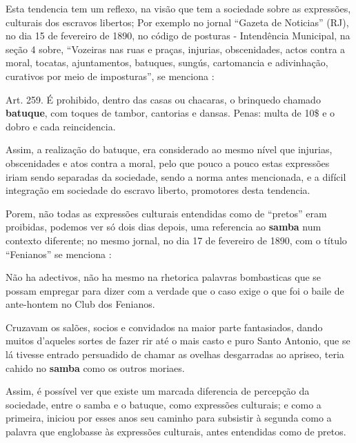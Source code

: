 Esta tendencia tem um reflexo, na visão que tem a sociedade sobre as expressões,
culturais dos escravos libertos; Por exemplo no jornal ``Gazeta de Noticias'' (RJ), 
no dia 15 de fevereiro de 1890,
no código de posturas - Intendência Municipal, 
na seção 4 sobre, 
``Vozeiras nas ruas e praças, injurias, obscenidades, 
actos contra a moral, tocatas, ajuntamentos, batuques, sungús, cartomancia e adivinhação,
curativos por meio de imposturas'', se menciona \cite[pp. 4]{batuqueperiodicogazetanoticias}:
\begin{citando}%
Art. 259. É prohibido, dentro das casas ou chacaras, o brinquedo chamado \textbf{batuque},
com toques de tambor, cantorias e dansas. Penas: multa de 10\$ e o dobro e cada reincidencia.
\end{citando}
Assim, a realização do batuque, era considerado ao mesmo nível que injurias, 
obscenidades e atos contra a moral, 
pelo que pouco a pouco estas expressões iriam sendo separadas da sociedade,
sendo a norma antes mencionada, e a difícil integração em sociedade do escravo liberto, 
promotores desta tendencia. 

Porem, não todas as expressões culturais entendidas como de ``pretos'' eram proibidas,
podemos ver só dois dias depois, uma referencia ao \textbf{samba} num contexto diferente; 
no mesmo jornal, 
no dia 17 de fevereiro de 1890, com o título ``Fenianos''
se menciona \cite[pp. 1]{batuqueperiodicogazetanoticias2}:
\begin{citando}%
Não ha adectivos, não ha mesmo na 
rhetorica palavras bombasticas que se 
possam empregar para dizer com a
verdade que o caso exige o que foi o baile
de ante-hontem no Club dos Fenianos.

Cruzavam os salões, socios e convidados
na maior parte fantasiados, dando
muitos d'aqueles sortes de fazer rir até
o mais casto e puro Santo Antonio, que se
lá tivesse entrado persuadido de chamar
as ovelhas desgarradas ao apriseo, teria
cahido no \textbf{samba} como os outros moriaes.
\end{citando}%
Assim, é possível ver que existe um marcada diferencia de percepção da sociedade, entre o samba e o batuque,
como expressões culturais; e como a primeira, 
iniciou por esses anos seu caminho para subsistir à segunda como a palavra que englobasse às
expressões culturais, antes entendidas como de pretos. 




